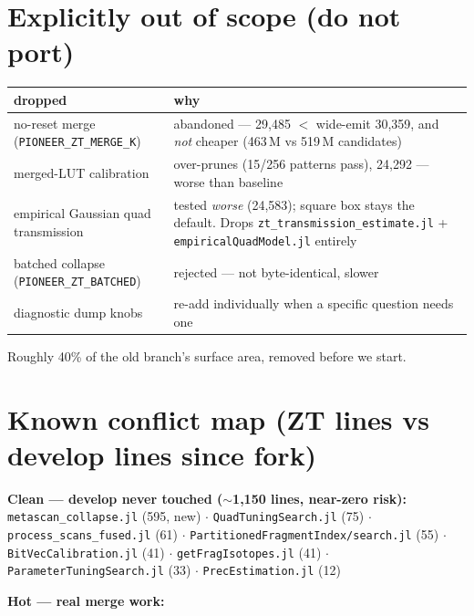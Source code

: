 \documentclass[11pt]{article}
\newcommand{\code}[1]{\texttt{\small #1}}
\begin{document}
\section{Explicitly out of scope (do not port)}\label{sec:oos}

\begin{center}
\begin{tabular}{p{}p{}}
\toprule
\textbf{dropped} & \textbf{why} \\
\midrule
no-reset merge (\code{PIONEER\_ZT\_MERGE\_K}) &
abandoned --- 29,485 $<$ wide-emit 30,359, and \emph{not} cheaper (463\,M vs 519\,M candidates) \\
\addlinespace
merged-LUT calibration &
over-prunes (15/256 patterns pass), 24,292 --- worse than baseline \\
\addlinespace
empirical Gaussian quad transmission &
tested \emph{worse} (24,583); square box stays the default. Drops
\code{zt\_transmission\_estimate.jl} + \code{empiricalQuadModel.jl} entirely \\
\addlinespace
batched collapse (\code{PIONEER\_ZT\_BATCHED}) &
rejected --- not byte-identical, slower \\
\addlinespace
diagnostic dump knobs &
re-add individually when a specific question needs one \\
\bottomrule
\end{tabular}
\end{center}

Roughly 40\% of the old branch's surface area, removed before we start.

\section{Known conflict map (ZT lines vs develop lines since fork)}

\textbf{Clean --- develop never touched ($\sim$1,150 lines, near-zero risk):}
\code{metascan\_collapse.jl} (595, new) $\cdot$ \code{QuadTuningSearch.jl} (75) $\cdot$
\code{process\_scans\_fused.jl} (61) $\cdot$ \code{PartitionedFragmentIndex/search.jl} (55)
$\cdot$ \code{BitVecCalibration.jl} (41) $\cdot$ \code{getFragIsotopes.jl} (41) $\cdot$
\code{ParameterTuningSearch.jl} (33) $\cdot$ \code{PrecEstimation.jl} (12)

\textbf{Hot --- real merge work:}
\end{document}
